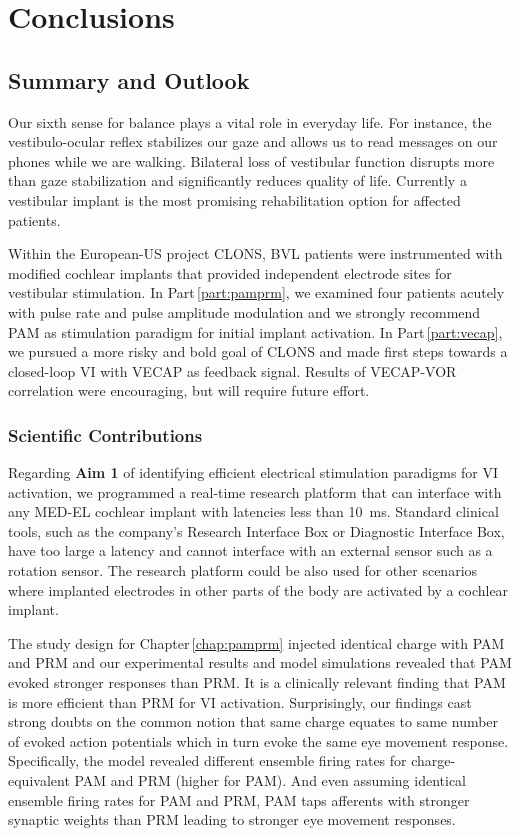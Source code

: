 \part{Conclusions}\label{part:conclusions}

\chapter{Summary and Outlook}


Our sixth sense for balance plays a vital role in everyday life. For instance, the vestibulo-ocular reflex stabilizes our gaze and allows us to read messages on our phones while we are walking. Bilateral loss of vestibular function disrupts more than gaze stabilization and significantly reduces quality of life. Currently a vestibular implant is the most promising rehabilitation option for affected patients.

Within the European-US project CLONS, BVL patients were instrumented with modified cochlear implants that provided independent electrode sites for vestibular stimulation. In Part\,\ref{part:pamprm}, we examined four patients acutely with pulse rate and pulse amplitude modulation and we strongly recommend PAM as stimulation paradigm for initial implant activation. In Part\,\ref{part:vecap}, we pursued a more risky and bold goal of CLONS and made first steps towards a closed-loop VI with VECAP as feedback signal. Results of VECAP-VOR correlation were encouraging, but will require future effort. 

\section*{Scientific Contributions}
Regarding \textbf{Aim 1} of identifying efficient electrical stimulation paradigms for VI activation, we programmed a real-time research platform that can interface with any MED-EL cochlear implant with latencies less than \SI{10}{\milli\second}. Standard clinical tools, such as the company's Research Interface Box or Diagnostic Interface Box, have too large a latency and cannot interface with an external sensor such as a rotation sensor. The research platform could be also used for other scenarios where implanted electrodes in other parts of the body are activated by a cochlear implant.

The study design for Chapter\,\ref{chap:pamprm} injected identical charge with PAM and PRM and our experimental results and model simulations revealed that PAM evoked stronger responses than PRM. It is a clinically relevant finding that PAM is more efficient than PRM for VI activation. Surprisingly, our findings cast strong doubts on the common notion that same charge equates to same number of evoked action potentials which in turn evoke the same eye movement response. Specifically, the model revealed different ensemble firing rates for charge-equivalent PAM and PRM (higher for PAM). And even assuming identical ensemble firing rates for PAM and PRM, PAM taps afferents with stronger synaptic weights than PRM leading to stronger eye movement responses.

